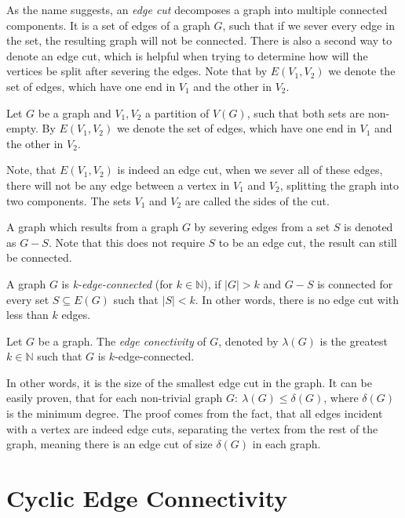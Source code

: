 \documentclass[12pt, twoside]{book}
\begin{document}

As the name suggests, an \textit{edge cut} decomposes a graph into multiple connected components. It is a set of edges of a graph $G$, such that if we sever every edge in the set, the resulting graph will not be connected. There is also a second way to denote an edge cut, which is helpful when trying to determine how will the vertices be split after severing the edges. Note that by $E(V_1,V_2)$ we denote the set of edges, which have one end in $V_1$ and the other in $V_2$.

Let $G$ be a graph and ${V_1,V_2}$ a partition of $V(G)$, such that both sets are non-empty. By $E(V_1,V_2)$ we denote the set of edges, which have one end in $V_1$ and the other in $V_2$.

Note, that $E(V_1,V_2)$ is indeed an edge cut, when we sever all of these edges, there will not be any edge between a vertex in $V_1$ and $V_2$, splitting the graph into two components. The sets $V_1$ and $V_2$ are called the sides of the cut.

A graph which results from a graph $G$ by severing edges from a set $S$ is denoted as $G-S$. Note that this does not require $S$ to be an edge cut, the result can still be connected.

A graph $G$ is \textit{k-edge-connected} (for $k\in\mathbb{N}$), if $|G|>k$ and $G-S$ is connected for every set $S\subseteq E(G)$ such that $|S|<k$. In other words, there is no edge cut with less than $k$ edges.


\begin{definition}
	Let $G$ be a graph. The \textit{edge conectivity} of $G$, denoted by $\lambda(G)$ is the greatest $k\in\mathbb{N}$ such that $G$ is $k$-edge-connected.
\end{definition}

In other words, it is the size of the smallest edge cut in the graph. It can be easily proven, that for each non-trivial graph $G:~\lambda(G)\leq\delta(G)$, where $\delta(G)$ is the minimum degree. The proof comes from the fact, that all edges incident with a vertex are indeed edge cuts, separating the vertex from the rest of the graph, meaning there is an edge cut of size $\delta(G)$ in each graph. 

\section{Cyclic Edge Connectivity}\label{sec:cyclic-edge-connectivity}
\end{document}
